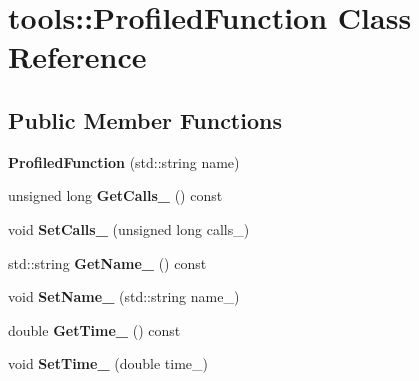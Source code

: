 \hypertarget{classtools_1_1_profiled_function}{\section{tools\+:\+:Profiled\+Function Class Reference}
\label{classtools_1_1_profiled_function}
}
\subsection*{Public Member Functions}
\begin{DoxyCompactItemize}
\item 
\hypertarget{classtools_1_1_profiled_function_adddd217edca9578f05fa5fe9ac6a516c}{{\bfseries Profiled\+Function} (std\+::string name)}\label{classtools_1_1_profiled_function_adddd217edca9578f05fa5fe9ac6a516c}

\item 
\hypertarget{classtools_1_1_profiled_function_a08b2e4125c16ae08de420a3319450c27}{unsigned long {\bfseries Get\+Calls\+\_\+} () const }\label{classtools_1_1_profiled_function_a08b2e4125c16ae08de420a3319450c27}

\item 
\hypertarget{classtools_1_1_profiled_function_a6acda1004ef92051cf29f250b3d88112}{void {\bfseries Set\+Calls\+\_\+} (unsigned long calls\+\_\+)}\label{classtools_1_1_profiled_function_a6acda1004ef92051cf29f250b3d88112}

\item 
\hypertarget{classtools_1_1_profiled_function_aaeb9958400ec2b608f1ba07bf318bf74}{std\+::string {\bfseries Get\+Name\+\_\+} () const }\label{classtools_1_1_profiled_function_aaeb9958400ec2b608f1ba07bf318bf74}

\item 
\hypertarget{classtools_1_1_profiled_function_ad4f29ccbd8d6c4ba4cc634393e759155}{void {\bfseries Set\+Name\+\_\+} (std\+::string name\+\_\+)}\label{classtools_1_1_profiled_function_ad4f29ccbd8d6c4ba4cc634393e759155}

\item 
\hypertarget{classtools_1_1_profiled_function_a36acb5f61af96dff784b7e93e1523ffb}{double {\bfseries Get\+Time\+\_\+} () const }\label{classtools_1_1_profiled_function_a36acb5f61af96dff784b7e93e1523ffb}

\item 
\hypertarget{classtools_1_1_profiled_function_a40f012a139c5488abcde00011ce205a4}{void {\bfseries Set\+Time\+\_\+} (double time\+\_\+)}\label{classtools_1_1_profiled_function_a40f012a139c5488abcde00011ce205a4}


\end{DoxyCompactItemize}
